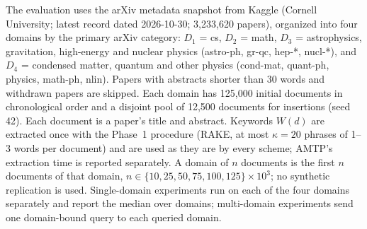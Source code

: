 
The evaluation uses the arXiv metadata snapshot from Kaggle (Cornell University; latest record dated
2026-10-30; 3{,}233{,}620 papers), organized into four domains by the primary arXiv category: $D_1$ = cs, $D_2$ = math,
$D_3$ = astrophysics, gravitation, high-energy and nuclear physics (astro-ph, gr-qc, hep-*, nucl-*), and
$D_4$ = condensed matter, quantum and other physics (cond-mat, quant-ph, physics, math-ph, nlin).
Papers with abstracts shorter than 30 words and withdrawn papers are skipped. Each domain has
125{,}000 initial documents in chronological order and a disjoint pool of 12{,}500 documents for
insertions (seed 42). Each document is a paper's title and abstract. Keywords $W(d)$ are extracted once with the Phase~1 procedure (RAKE, at
most $\kappa = 20$ phrases of 1--3 words per document) and are used as they are by every scheme; AMTP's
extraction time is reported separately. A domain of $n$ documents is the first $n$ documents of that
domain, $n \in \{10, 25, 50, 75, 100, 125\} \times 10^{3}$; no synthetic replication is used.
Single-domain experiments run on each of the four domains separately and report the median over domains;
multi-domain experiments send one domain-bound query to each queried domain.



